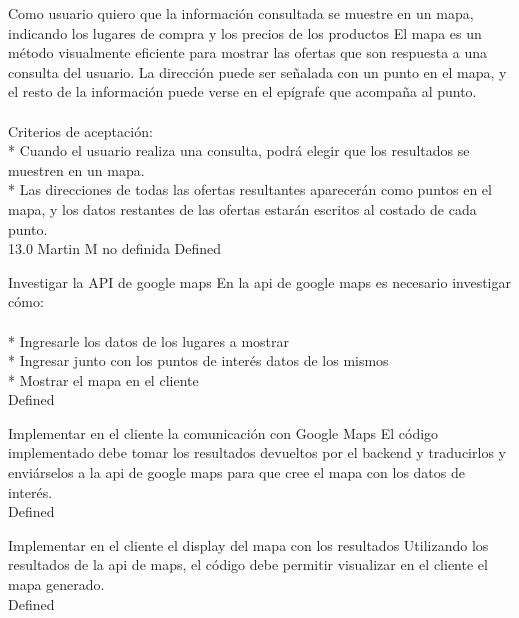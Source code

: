 	{Como usuario quiero que la información consultada se muestre en un mapa, indicando los lugares de compra y los precios de los productos} %
	{El mapa es un método visualmente eficiente para mostrar las ofertas que son
respuesta a una consulta del usuario. La dirección puede ser señalada con un
punto en el mapa, y el resto de la información puede verse en el epígrafe que
acompaña al punto.\\
  \\
Criterios de aceptación:\\
* Cuando el usuario realiza una consulta, podrá elegir que los resultados se muestren en un mapa.  \\
* Las direcciones de todas las ofertas resultantes aparecerán como puntos en el mapa, y los datos restantes de las ofertas estarán escritos al costado de cada punto.\\
} %
	{} %
	{13.0} %
	{Martin M} %
	{no definida} %
	{Defined} %

		{Investigar la API de google maps} %
		{En la api de google maps es necesario investigar cómo:\\
  \\
* Ingresarle los datos de los lugares a mostrar\\
* Ingresar junto con los puntos de interés datos de los mismos\\
* Mostrar el mapa en el cliente\\
} %
		{} %
		{} %
		{} %
		{Defined} %

		{Implementar en el cliente la comunicación con Google Maps} %
		{El código implementado debe tomar los resultados devueltos por el backend y
traducirlos y enviárselos a la api de google maps para que cree el mapa con
los datos de interés.\\
} %
		{} %
		{} %
		{} %
		{Defined} %

		{Implementar en el cliente el display del mapa con los resultados} %
		{Utilizando los resultados de la api de maps, el código debe permitir
visualizar en el cliente el mapa generado.\\
} %
		{} %
		{} %
		{} %
		{Defined} %


